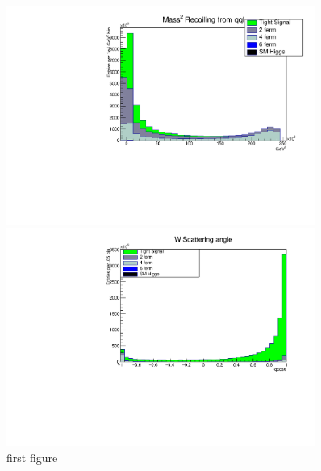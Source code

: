 \begin{figure}
 \centering
    \begin{minipage}{0.49\textwidth}
        \centering
        \includegraphics[width=0.9\textwidth]{vrecoilHist.pdf} %
       
    \end{minipage}\hfill
    \begin{minipage}{0.49\textwidth}
        \centering
        \includegraphics[width=0.9\textwidth]{qcostHist.pdf} %
        
     \end{minipage}
          \caption{first figure}
\end{figure}

